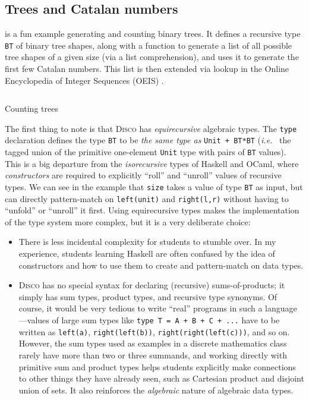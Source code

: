 \documentclass[submission,copyright,creativecommons]{eptcs}
\newcommand{\disco}{\textsc{Disco}\xspace}
\newcommand{\ie}{\emph{i.e.}\ }
\newcommand{\pref}[1]{\prettyref{#1}}
\begin{document}
\subsection{Trees and Catalan numbers}

\pref{lst:catalan} is a fun example generating and counting binary
trees. It defines a recursive type \texttt{BT} of binary tree shapes,
along with a function to generate a list of all possible tree shapes
of a given size (via a list comprehension), and uses it to generate
the first few Catalan numbers.  This list is then extended via lookup
in the Online Encyclopedia of Integer Sequences (OEIS) \cite{oeis}.

\begin{listing}
  \inputminted{text}{examples/catalan.disco}
  \caption{Counting trees}
  \label{lst:catalan}
\end{listing}

The first thing to note is that \disco has \emph{equirecursive}
algebraic types.  The \texttt{type} declaration defines the type
\texttt{BT} to be \emph{the same type as} \texttt{Unit + BT*BT} (\ie
the tagged union of the primitive one-element \texttt{Unit} type with
pairs of \texttt{BT} values).  This is a big departure from the
\emph{isorecursive} types of Haskell and OCaml, where
\emph{constructors} are required to explicitly ``roll'' and ``unroll''
values of recursive types.  We can see in the example that
\texttt{size} takes a value of type \texttt{BT} as input, but can
directly pattern-match on \texttt{left(unit)} and \texttt{right(l,r)}
without having to ``unfold'' or ``unroll'' it first.  Using
equirecursive types makes the implementation of the type system more
complex, but it is a very deliberate choice:
\begin{itemize}
\item There is less incidental complexity for students to stumble
  over.  In my experience, students learning Haskell are often
  confused by the idea of constructors and how to use them to create
  and pattern-match on data types.
\item \disco has no special syntax for declaring (recursive)
  sums-of-products; it simply has sum types, product types, and
  recursive type synonyms. Of course, it would be very tedious to
  write ``real'' programs in such a language---values of large sum
  types like \texttt{type T = A + B + C + ...} have to be written as
  \texttt{left(a)}, \texttt{right(left(b))},
  \texttt{right(right(left(c)))}, and so on. However, the sum types
  used as examples in a discrete mathematics class rarely have more than two
  or three summands, and working directly with primitive sum and
  product types helps students explicitly make connections to other
  things they have already seen, such as Cartesian product and
  disjoint union of sets.  It also reinforces the \emph{algebraic}
  nature of algebraic data types.
\end{itemize}
\end{document}
